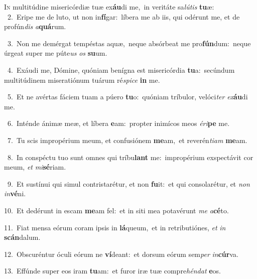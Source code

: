 \lettrine{\initial\textcolor{\initialcolor}{I}}{n} multitúdine misericórdiæ tuæ ex\-\textbf{áu}\-di me,~\star in veritáte sa\-\textit{lú}\-\textit{tis} \textbf{tu}\-æ:\\
{\numbfont\textcolor{\numbcolor}{~2.}}~Eripe me de luto, ut non in\-\textbf{fí}\-gar:~\star líbera me ab iis, qui odérunt me, et de profún\textit{dis} \textit{a}\-\textbf{quá}rum.\par
{\numbfont\textcolor{\numbcolor}{~3.}}~Non me demérgat tempéstas aquæ,~\dagger neque absórbeat me pro\-\textbf{fún}\-dum:~\star neque úrgeat super me púte\textit{us} \textit{os} \textbf{su}\-um.\par
{\numbfont\textcolor{\numbcolor}{~4.}}~Exáudi me, Dómine, quóniam benígna est misericórdia \textbf{tu}\-a:~\star secúndum multitúdinem miseratiónum tuárum ré\-\textit{spi}\-\textit{ce} \textbf{in} me.\par
{\numbfont\textcolor{\numbcolor}{~5.}}~Et ne avértas fáciem tuam a púero \textbf{tu}\-o:~\star quóniam tríbulor, velóci\textit{ter} \textit{ex}\-\textbf{áu}di me.\par
{\numbfont\textcolor{\numbcolor}{~6.}}~Inténde ánimæ meæ, et líbera \textbf{e}\-am:~\star propter inimícos meos \textit{é}\-\textit{ri}\textbf{pe} me.\par
{\numbfont\textcolor{\numbcolor}{~7.}}~Tu scis impropérium meum, et confusiónem \textbf{me}\-am,~\star et reverén\-\textit{ti}\-\textit{am} \textbf{me}\-am.\par
{\numbfont\textcolor{\numbcolor}{~8.}}~In conspéctu tuo sunt omnes qui tríbu\textbf{lant} me:~\star impropérium exspectávit cor meum, \textit{et} \textit{mi}\-\textbf{sé}riam.\par
{\numbfont\textcolor{\numbcolor}{~9.}}~Et sustínui qui simul contristarétur, et non \textbf{fu}\-it:~\star et qui consolarétur, et \textit{non} \textit{in}\-\textbf{vé}ni.\par
{\numbfont\textcolor{\numbcolor}{10.}}~Et dedérunt in escam \textbf{me}\-am fel:~\star et in siti mea potavérunt \textit{me} \textit{a}\-\textbf{cé}to.\par
{\numbfont\textcolor{\numbcolor}{11.}}~Fiat mensa eórum coram ipsis in \textbf{lá}\-queum,~\star et in retributiónes, \textit{et} \textit{in} \textbf{scán}\-dalum.\par
{\numbfont\textcolor{\numbcolor}{12.}}~Obscuréntur óculi eórum ne \textbf{ví}\-deant:~\star et dorsum eórum sem\textit{per} \textit{in}\-\textbf{cúr}va.\par
{\numbfont\textcolor{\numbcolor}{13.}}~Effúnde super eos iram \textbf{tu}\-am:~\star et furor iræ tuæ compre\-\textit{hén}\-\textit{dat} \textbf{e}\-os.\par
